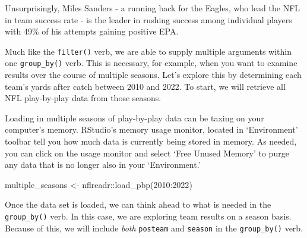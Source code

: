 \documentclass[
  letterpaper,
]{krantz}
\newenvironment{Shaded}{\begin{snugshade}}{\end{snugshade}}
\newcommand{\DecValTok}[1]{\textcolor[rgb]{0.68,0.00,0.00}{#1}}
\newcommand{\FunctionTok}[1]{\textcolor[rgb]{0.28,0.35,0.67}{#1}}
\newcommand{\NormalTok}[1]{\textcolor[rgb]{0.00,0.23,0.31}{#1}}
\newcommand{\OtherTok}[1]{\textcolor[rgb]{0.00,0.23,0.31}{#1}}
\newcommand{\SpecialCharTok}[1]{\textcolor[rgb]{0.37,0.37,0.37}{#1}}
\begin{document}
Unsurprisingly, Miles Sanders - a running back for the Eagles, who lead
the NFL in team success rate - is the leader in rushing success among
individual players with 49\% of his attempts gaining positive EPA.

Much like the \texttt{filter()} verb, we are able to supply multiple
arguments within one \texttt{group\_by()} verb. This is necessary, for
example, when you want to examine results over the course of multiple
seasons. Let's explore this by determining each team's yards after catch
between 2010 and 2022. To start, we will retrieve all NFL play-by-play
data from those seasons.

\begin{tcolorbox}[enhanced jigsaw, colback=white, leftrule=.75mm, breakable, colframe=quarto-callout-caution-color-frame, bottomtitle=1mm, rightrule=.15mm, left=2mm, opacityback=0, bottomrule=.15mm, arc=.35mm, coltitle=black, colbacktitle=quarto-callout-caution-color!10!white, toptitle=1mm, titlerule=0mm, title=\textcolor{quarto-callout-caution-color}{\faFire}\hspace{0.5em}{Caution}, toprule=.15mm, opacitybacktitle=0.6]

Loading in multiple seasons of play-by-play data can be taxing on your
computer's memory. RStudio's memory usage monitor, located in
`Environment' toolbar tell you how much data is currently being stored
in memory. As needed, you can click on the usage monitor and select
`Free Unused Memory' to purge any data that is no longer also in your
`Environment.'

\end{tcolorbox}

\begin{Shaded}
\begin{Highlighting}[]
\NormalTok{multiple\_seasons }\OtherTok{\textless{}{-}}\NormalTok{ nflreadr}\SpecialCharTok{::}\FunctionTok{load\_pbp}\NormalTok{(}\DecValTok{2010}\SpecialCharTok{:}\DecValTok{2022}\NormalTok{)}
\end{Highlighting}
\end{Shaded}

Once the data set is loaded, we can think ahead to what is needed in the
\texttt{group\_by()} verb. In this case, we are exploring team results
on a season basis. Because of this, we will include \emph{both}
\texttt{posteam} and \texttt{season} in the \texttt{group\_by()} verb.
\end{document}
